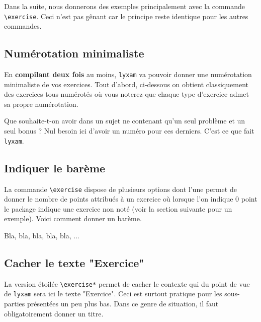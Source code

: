 \documentclass[12pt,a4paper]{scrartcl}
\begin{document}
Dans la suite, nous donnerons des exemples principalement avec la commande \verb+\exercise+. Ceci n'est pas gênant car le principe reste identique pour les autres commandes.


    \subsection{Numérotation minimaliste}

En \textbf{compilant deux fois} au moins, \verb+lyxam+ va pouvoir donner une numérotation minimaliste de vos exercices. Tout d'abord, ci-dessous on obtient classiquement des exercices tous numérotés où vous noterez que chaque type d'exercice admet sa propre numérotation.


\begin{tcblisting}{}
\exercise
\exercise
\problem
\problem
\end{tcblisting}


Que souhaite-t-on avoir dans un sujet ne contenant qu'un seul problème et un seul bonus ? Nul besoin ici d'avoir un numéro pour ces derniers. C'est ce que fait \verb+lyxam+.

\resetallcnt{}

\begin{tcblisting}{}
\exercise
\exercise
\problem
\bonus
\end{tcblisting}



    \subsection{Indiquer le barème}

La commande \verb+\exercise+ dispose de plusieurs options dont l'une permet de donner le nombre de points attribués à un exercice où lorsque l'on indique $0$ point le package indique une exercice non noté (voir la section suivante pour un exemple). Voici comment donner un barème.

\resetallcnt{}

\begin{tcblisting}{}
\exercise[pts = 5]
Bla, bla, bla, bla, bla, ...
\end{tcblisting}


    \subsection{Cacher le texte "Exercice"}

La version étoilée \verb+\exercise*+ permet de cacher le contexte qui du point de vue de \verb+lyxam+ sera ici le texte "Exercice". Ceci est surtout pratique pour les sous-parties présentées un peu plus bas. Dans ce genre de situation, il faut obligatoirement donner un titre.
\end{document}
